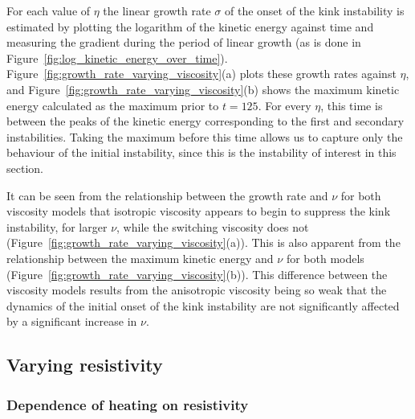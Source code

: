 For each value of $\eta$ the linear growth rate $\sigma$ of the onset of the kink instability is estimated by plotting the logarithm of the kinetic energy against time and measuring the gradient during the period of linear growth (as is done in Figure~\ref{fig:log_kinetic_energy_over_time}). Figure~\ref{fig:growth_rate_varying_viscosity}(a) plots these growth rates against $\eta$, and Figure~\ref{fig:growth_rate_varying_viscosity}(b) shows the maximum kinetic energy calculated as the maximum prior to $t=125$. For every $\eta$, this time is between the peaks of the kinetic energy corresponding to the first and secondary instabilities. Taking the maximum before this time allows us to capture only the behaviour of the initial instability, since this is the instability of interest in this section.

It can be seen from the relationship between the growth rate and $\nu$ for both viscosity models that isotropic viscosity appears to begin to suppress the kink instability, for larger $\nu$, while the switching viscosity does not (Figure~\ref{fig:growth_rate_varying_viscosity}(a)). This is also apparent from the relationship between the maximum kinetic energy and $\nu$ for both models (Figure~\ref{fig:growth_rate_varying_viscosity}(b)). This difference between the viscosity models results from the anisotropic viscosity being so weak that the dynamics of the initial onset of the kink instability are not significantly affected by a significant increase in $\nu$.

\subsection{Varying resistivity}

\subsubsection{Dependence of heating on resistivity}

